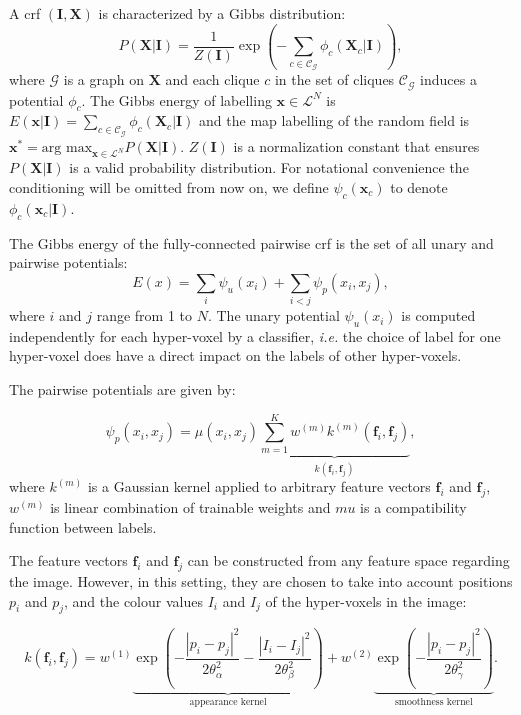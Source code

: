 \documentclass{article}
\begin{document}
A \acrlong{crf} $(\textbf{I}, \textbf{X})$ is characterized by a Gibbs distribution:
\begin{equation}
    P(\textbf{X} | \textbf{I}) = \frac{1}{Z(\textbf{I})}\exp{ \left ( -\sum_{c \in \mathcal{C_G} }{ \phi_c(\textbf{X}_c| \textbf{I})} \right )},
\end{equation}
where $\mathcal{G}$ is a graph on $\textbf{X}$ and each clique $c$ in the set of cliques $\mathcal{C_G}$ induces a potential $\phi_c$. 
The Gibbs energy of labelling $\textbf{x} \in \mathcal{L}^N$ is $E(\textbf{x}|\textbf{I}) = \sum_{c \in \mathcal{C_G} }{ \phi_c(\textbf{X}_c| \textbf{I})} $ and the \gls{map} labelling of the random field is $\textbf{x}^\ast = \text{arg max}_{\textbf{x} \in \mathcal{L}^N} P(\textbf{X} | \textbf{I})$.
$Z(\textbf{I})$ is a normalization constant that ensures $P(\textbf{X} | \textbf{I})$ is a valid probability distribution.
For notational convenience the conditioning will be omitted from now on, we define $\psi_c(\textbf{x}_c)$ to denote $\phi_c(\textbf{x}_c| \textbf{I})$.


The Gibbs energy of the fully-connected pairwise \gls{crf} is the set of all unary and pairwise potentials:
\begin{equation}
    E(x) = \sum_{i}{\psi_u(x_i)} + \sum_{i<j}{\psi_p(x_i, x_j)},
\end{equation}
where $i$ and $j$ range from 1 to $N$.
The unary potential $\psi_u(x_i)$ is computed independently for each hyper-voxel by a classifier, \textit{i.e.} the choice of label for one hyper-voxel does have a direct impact on the labels of other hyper-voxels.

The pairwise potentials are given by:
 
\begin{equation}
    \psi_p(x_i, x_j) = \mu(x_i, x_j) \underbrace{\sum_{m=1}^{K}{w^{(m)}k^{(m)}(\textbf{f}_i, \textbf{f}_j)}}_{k(\textbf{f}_i, \textbf{f}_j)},
\end{equation}
where $k^{(m)}$ is a Gaussian kernel applied to arbitrary feature vectors $\textbf{f}_i$ and $\textbf{f}_j$, $w^{(m)}$ is linear combination of trainable weights and $mu$ is a compatibility function between labels.

The feature vectors $\textbf{f}_i$ and $\textbf{f}_j$ can be constructed from any feature space regarding the image. 
However, in this setting, they are chosen to take into account positions $p_i$ and $p_j$, and the colour values $I_i$ and $I_j$ of the hyper-voxels in the image:

\begin{equation}
    k(\textbf{f}_i, \textbf{f}_j) = w^{(1)}\underbrace{\exp{\left ( -\frac{|p_i-p_j|^2}{2\theta_\alpha^2} - \frac{|I_i-I_j|^2}{2\theta_\beta^2} \right )}}_{\text{appearance kernel}} + w^{(2)}\underbrace{\exp{\left ( - \frac{|p_i-p_j|^2}{2\theta_\gamma^2}\right )}}_{\text{smoothness kernel}}.
\end{equation}
\end{document}
